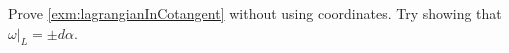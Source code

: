 

    Prove \cref{exm:lagrangianInCotangent} without using coordinates. Try showing that $\omega|_L=\pm d\alpha$. 

